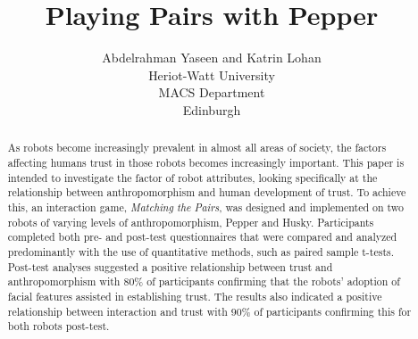 \documentclass[letterpaper]{article} %
\begin{document}
%
\title{Playing Pairs with Pepper}
\author{ Abdelrahman Yaseen and Katrin Lohan\\
Heriot-Watt University\\
MACS Department\\
Edinburgh\\
}
\maketitle
\begin{abstract}
As robots become increasingly prevalent in almost all areas of society, the factors affecting humans trust in those robots becomes increasingly important. This paper is intended to investigate the factor of robot attributes, looking specifically at the relationship between anthropomorphism and human development of trust. To achieve this, an interaction game, \textit{Matching} \textit{the} \textit{Pairs}, was designed and implemented on two robots of varying levels of anthropomorphism, Pepper and Husky. Participants completed both pre- and post-test questionnaires that were compared and analyzed predominantly with the use of quantitative methods, such as paired sample t-tests. Post-test analyses suggested a positive relationship between trust and anthropomorphism with $80\%$ of participants confirming that the robots' adoption of facial features assisted in establishing trust. The results also indicated a positive relationship between interaction and trust with $90\%$ of participants confirming this for both robots post-test.
\end{abstract}
\end{document}
